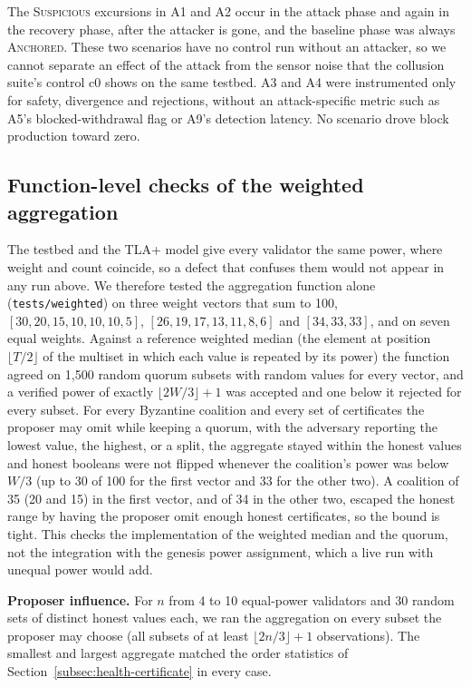 The \textsc{Suspicious} excursions in A1 and A2 occur in the attack phase and
again in the recovery phase, after the attacker is gone, and the baseline phase
was always \textsc{Anchored}. These two scenarios have no control run without
an attacker, so we cannot separate an effect of the attack from the sensor
noise that the collusion suite's control c0 shows on the same testbed. A3 and
A4 were instrumented only for safety, divergence and rejections, without an
attack-specific metric such as A5's blocked-withdrawal flag or A9's detection
latency. No scenario drove block production toward zero.

\FloatBarrier

\subsection*{Function-level checks of the weighted aggregation}

The testbed and the TLA+ model give every
validator the same power, where weight and count coincide, so a defect that
confuses them would not appear in any run above. We therefore tested the
aggregation function alone (\texttt{tests/weighted}) on three weight vectors that
sum to 100, $[30,20,15,10,10,10,5]$, $[26,19,17,13,11,8,6]$ and $[34,33,33]$, and
on seven equal weights. Against a reference weighted median (the element at
position $\lfloor T/2\rfloor$ of the multiset in which each value is repeated by
its power) the function agreed on 1{,}500 random quorum subsets with random
values for every vector, and a verified power of exactly $\lfloor 2W/3\rfloor{+}1$
was accepted and one below it rejected for every subset. For every Byzantine
coalition and every set of certificates the proposer may omit while keeping a
quorum, with the adversary reporting the lowest value, the highest, or a split,
the aggregate stayed within the honest values and honest booleans were not
flipped whenever the coalition's power was below $W/3$ (up to 30 of 100 for the
first vector and 33 for the other two). A coalition of 35 (20 and 15) in the first
vector, and of 34 in the other two, escaped the honest range by having the proposer omit
enough honest certificates, so the bound is tight. This checks the
implementation of the weighted median and the quorum, not the integration
with the genesis power assignment, which a live run with unequal power would
add.

\textbf{Proposer influence.} For $n$ from 4 to 10 equal-power validators and 30
random sets of distinct honest values each, we ran the aggregation on every
subset the proposer may choose (all subsets of at least $\lfloor 2n/3 \rfloor + 1$
observations). The smallest and largest aggregate matched the order statistics of
Section~\ref{subsec:health-certificate} in every case.

